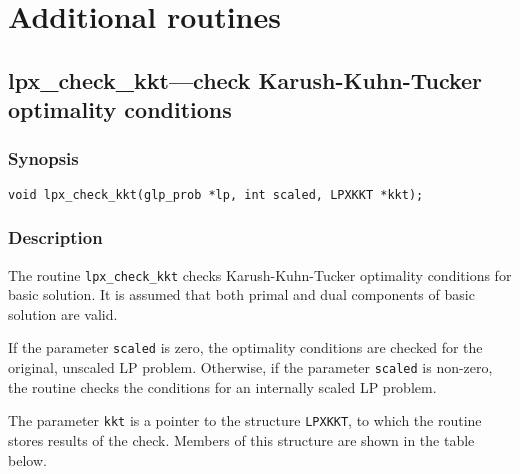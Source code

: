 
\newpage

\section{Additional routines}

\subsection{lpx\_check\_kkt---check Karush-Kuhn-Tucker optimality
conditions}

\subsubsection*{Synopsis}

\begin{verbatim}
void lpx_check_kkt(glp_prob *lp, int scaled, LPXKKT *kkt);
\end{verbatim}

\subsubsection*{Description}

The routine \verb|lpx_check_kkt| checks Karush-Kuhn-Tucker optimality
conditions for basic solution. It is assumed that both primal and dual
components of basic solution are valid.

If the parameter \verb|scaled| is zero, the optimality conditions are
checked for the original, unscaled LP problem. Otherwise, if the
parameter \verb|scaled| is non-zero, the routine checks the conditions
for an internally scaled LP problem.

The parameter \verb|kkt| is a pointer to the structure \verb|LPXKKT|,
to which the routine stores results of the check. Members of this
structure are shown in the table below.

